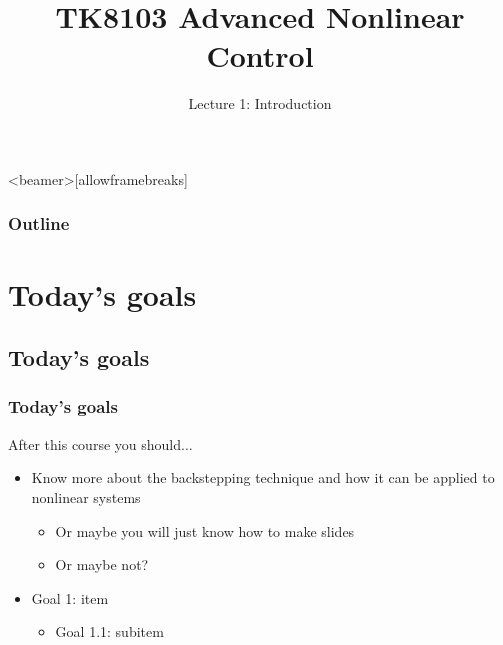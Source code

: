 \documentclass[]{beamer}
\title[Lecture 1: Introduction] %
{TK8103 Advanced Nonlinear Control}
\institute{}
\subtitle
 {Lecture 1: Introduction}
\date[] %
{}
\begin{document}


 \begin{frame}
  \titlepage
 \end{frame}

\begin{frame}<beamer>[allowframebreaks]
  \frametitle{Outline}
  \tableofcontents
\end{frame}

\section{Today's goals}

\subsection{Today's goals}
\begin{frame}[t]
	\frametitle{\color{white} Today's goals}
	\begin{block}{After this course you should...}
		\begin{itemize}
		\item Know more about the backstepping technique and how it can be applied to nonlinear systems
			\begin{itemize}
			\item Or maybe you will just know how to make slides 
			\item Or maybe \alert{not}?
			\end{itemize}
			
		\item Goal 1: item 
			\begin{itemize}
			\item Goal 1.1: subitem
			\end{itemize}
		\end{itemize}
	\end{block}
\end{frame}
\end{document}
